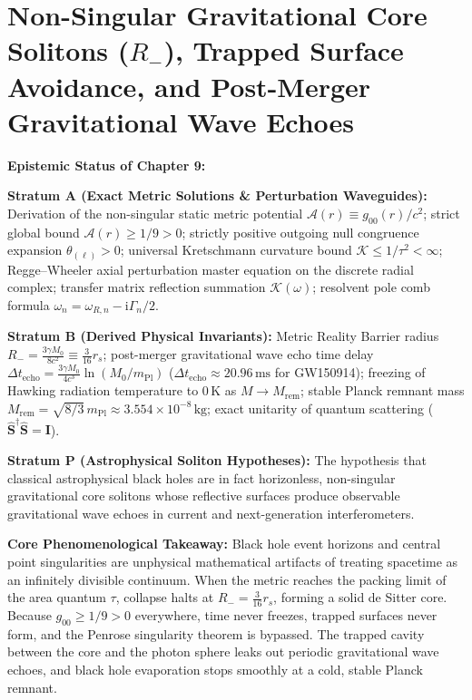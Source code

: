 \documentclass[
    12pt,
    a4paper,
    headings=normal,
    twoside=false,
    open=any,
    parskip=half
]{scrbook}
\newcommand{\iu}{\mathrm{i}}
\begin{document}
\chapter{Non-Singular Gravitational Core Solitons ($R_-$), Trapped Surface Avoidance, and Post-Merger Gravitational Wave Echoes}
\label{chap:ch9_expanded}

\begin{firewallbox}
\textbf{Epistemic Status of Chapter 9:}\par\smallskip\noindent
\textbf{Stratum A (Exact Metric Solutions \& Perturbation Waveguides):} Derivation of the non-singular static metric potential $\mathcal{A}(r) \equiv g_{00}(r)/c^2$; strict global bound $\mathcal{A}(r) \ge 1/9 > 0$; strictly positive outgoing null congruence expansion $\theta_{(\ell)} > 0$; universal Kretschmann curvature bound $\mathcal{K} \le 1/\tau^2 < \infty$; Regge--Wheeler axial perturbation master equation on the discrete radial complex; transfer matrix reflection summation $\mathcal{K}(\omega)$; resolvent pole comb formula $\omega_n = \omega_{R, n} - \iu \Gamma_n / 2$.\par\smallskip\noindent
\textbf{Stratum B (Derived Physical Invariants):} Metric Reality Barrier radius $R_- = \frac{3\gamma M_0}{8c^2} \equiv \frac{3}{16}r_s$; post-merger gravitational wave echo time delay $\Delta t_{\text{echo}} = \frac{3\gamma M_0}{4c^3}\ln(M_0/m_{\text{Pl}})$ ($\Delta t_{\text{echo}} \approx 20.96\,\text{ms}$ for GW150914); freezing of Hawking radiation temperature to $0\,\text{K}$ as $M \to M_{\text{rem}}$; stable Planck remnant mass $M_{\text{rem}} = \sqrt{8/3}\,m_{\text{Pl}} \approx 3.554 \times 10^{-8}\,\text{kg}$; exact unitarity of quantum scattering ($\hat{\mathbf{S}}^\dagger \hat{\mathbf{S}} = \mathbf{I}$).\par\smallskip\noindent
\textbf{Stratum P (Astrophysical Soliton Hypotheses):} The hypothesis that classical astrophysical black holes are in fact horizonless, non-singular gravitational core solitons whose reflective surfaces produce observable gravitational wave echoes in current and next-generation interferometers.\par\smallskip\noindent
\textbf{Core Phenomenological Takeaway:} Black hole event horizons and central point singularities are unphysical mathematical artifacts of treating spacetime as an infinitely divisible continuum. When the metric reaches the packing limit of the area quantum $\tau$, collapse halts at $R_- = \frac{3}{16}r_s$, forming a solid de Sitter core. Because $g_{00} \ge 1/9 > 0$ everywhere, time never freezes, trapped surfaces never form, and the Penrose singularity theorem is bypassed. The trapped cavity between the core and the photon sphere leaks out periodic gravitational wave echoes, and black hole evaporation stops smoothly at a cold, stable Planck remnant.
\end{firewallbox}
\end{document}
